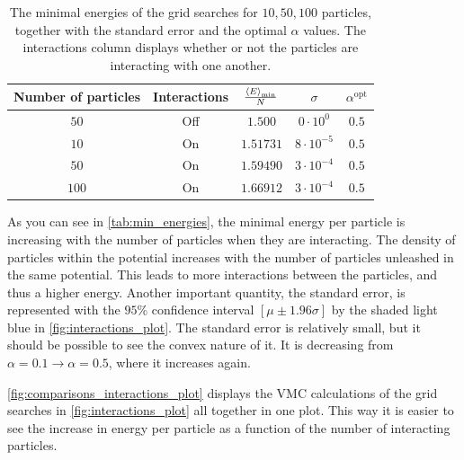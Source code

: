 \begin{table}[H]
    \centering
    \begin{tabular}{ccccc}
    \hline \hline
        Number of particles & Interactions & $\frac{\expval{E}_{\mathrm{min}}}{N}$ & $\sigma$ & $\alpha^{\mathrm{opt}}$\\
    \hline \hline
        $50$ & Off & $1.500$ & $0\cdot10^{0}$ & $0.5$\\
        $10$ & On & $1.51731$& $8\cdot10^{-5}$& $0.5$ \\
        $50$ & On & $1.59490$& $3\cdot10^{-4}$ &$0.5$ \\
        $100$ & On & $1.66912$ & $3\cdot10^{-4}$ & $0.5$ \\
    \hline \hline
    \end{tabular}
    \caption{The minimal energies of the grid searches for $10, 50, 100$ particles, together with the standard error and the optimal $\alpha$ values. The interactions column displays whether or not the particles are interacting with one another.}
    \label{tab:min_energies}
\end{table}

As you can see in \autoref{tab:min_energies}, the minimal energy per particle is increasing with the number of particles when they are interacting. The density of particles within the potential increases with the number of particles unleashed in the same potential. This leads to more interactions between the particles, and thus a higher energy. Another important quantity, the standard error, is represented with the $95$\% confidence interval $[\mu\pm1.96\sigma]$ by the shaded light blue in \autoref{fig:interactions_plot}. The standard error is relatively small, but it should be possible to see the convex nature of it. It is decreasing from $\alpha=0.1\to\alpha=0.5$, where it increases again. 


\autoref{fig:comparisons_interactions_plot} displays the VMC calculations of the grid searches in \autoref{fig:interactions_plot} all together in one plot. This way it is easier to see the increase in energy per particle as a function of the number of interacting particles. 

